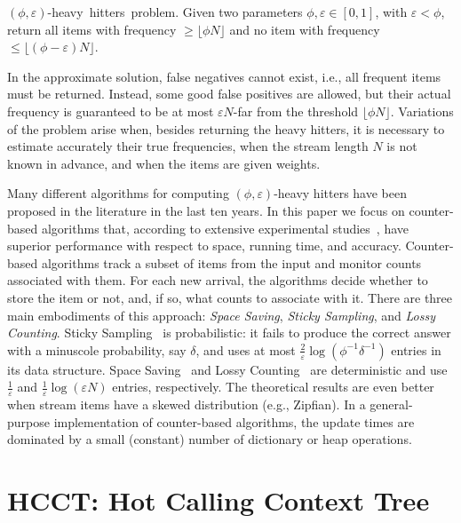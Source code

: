 \documentclass{sigplanconf}
\begin{document}
\begin{definition} 
{\mbox{$(\phi,\varepsilon)$-heavy hitters problem.}} Given two parameters $\phi,\varepsilon\in[0,1]$, with $\varepsilon<\phi$, return all items with frequency $\ge\lfloor\phi N\rfloor$ and no item with frequency $\le\lfloor(\phi-\varepsilon) N\rfloor$.
\end{definition} 

In the approximate solution, false negatives cannot exist, i.e., all frequent items must be returned. Instead, some good false positives are allowed, but their actual frequency is guaranteed to be at most $\varepsilon N$-far from the threshold $\lfloor\phi N\rfloor$. Variations of the problem arise when, besides returning the heavy hitters, it is necessary to estimate accurately their true frequencies, when the stream length $N$ is not known in advance, and when the items are given weights. 

Many different algorithms for computing $(\phi,\varepsilon)$-heavy hitters have been proposed in the literature in the last ten years. In this paper we focus on counter-based algorithms that, according to extensive experimental studies~\cite{CH08}, have superior performance with respect to space, running time, and accuracy. Counter-based algorithms track a subset of items from the input and monitor counts associated with them. For each new arrival, the algorithms decide whether to store the item or not, and, if so, what counts to associate with it. There are three main embodiments of this approach: {\em Space Saving}, {\em Sticky Sampling}, and {\em Lossy Counting}. Sticky Sampling~\cite{MM02} is probabilistic: it fails to produce the correct answer with a minuscole probability, say $\delta$, and uses at most $\frac{2}{\varepsilon} \log(\phi^{-1}\delta^{-1})$ entries in its data structure. Space Saving~\cite{MAA06} and Lossy Counting~\cite{MM02} are deterministic and use $\frac{1}{\varepsilon}$ and $\frac{1}{\varepsilon}\log(\varepsilon N)$ entries, respectively. The theoretical results are even better when stream items have a skewed distribution (e.g., Zipfian). In a general-purpose implementation of counter-based algorithms, the update times are dominated by a small (constant) number of dictionary or heap operations.


\section{HCCT: Hot Calling Context Tree}
\label{se:hot}
\end{document}
